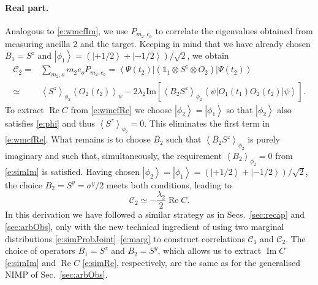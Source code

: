 \documentclass[epjST,numbook]{svjour}
\newcommand{\wmcf}{\mathscr{C}}
\newcommand{\ket}[1]{\left \vert #1 \right >}
\newcommand{\matel}[3]{ \displaystyle \left\langle #1 \right \vert #2 \left\vert  #3 \right\rangle }
\newcommand{\expval}[1]{\left\langle #1 \right\rangle}
\newcommand{\impart}[1]{\text{Im}\left[ #1 \right]}
\newcommand{\realpart}[1]{\text{Re}\left[ #1 \right]}
\DeclareMathOperator{\imp }{\mathrm{Im}}
\DeclareMathOperator{\rep}{\mathrm{Re}}
\begin{document}
\paragraph{Real part.} 
Analogous to \eqref{e:wmcfIm}, we use $P_{m_2,e_o}$ to correlate the eigenvalues obtained from measuring ancilla $2$ and the target. Keeping in mind that we have already chosen $B_1=S^z$ and $\ket{\phi_1}=(\ket{+1/2}+\ket{-1/2})/\sqrt{2}$, we obtain
\begin{equation}\label{e:wmcfRe}
\begin{split}
\wmcf_2 =& \sum_{m_2,o}m_2 e_o P_{m_2,e_o} = \matel{\Psi(t_2)}{(\mathds{1}_1\otimes S^z\otimes O_2)}{\Psi(t_2)} \\
\simeq& \expval{S^z}_{\phi_2}\expval{O_2(t_2)}_{\psi} -2\lambda_2\impart{\expval{B_2S^z}_{\phi_2} \matel{\psi}{O_1(t_1)O_2(t_2)}{\psi}} %
.
\end{split}
\end{equation}
To extract $\rep C$ from \eqref{e:wmcfRe} we choose $\ket{\phi_2}=\ket{\phi_1}$ so that $\ket{\phi_2}$ also satisfies \eqref{e:phi} and thus $\expval{S^z}_{\phi_2}=0$. This eliminates the first term in \eqref{e:wmcfRe}. What remains is to choose $B_2$ such that $\expval{B_2S^z}_{\phi_2}$ is purely imaginary and such that, simultaneously, the requirement $\expval{B_2}_{\phi_2} =0$ from \eqref{e:simIm} is satisfied. Having chosen $\ket{\phi_2}=\ket{\phi_1}=(\ket{+1/2}+\ket{-1/2})/\sqrt{2}$, the choice ${B_2=S^y=\sigma^y/2}$ meets both conditions, leading to
\begin{equation}\label{e:simRe}
	\wmcf_2 \simeq - \frac{\lambda_2}{2}\rep C .
\end{equation}
In this derivation we have followed a similar strategy as in Secs.~\ref{sec:recap} and \ref{sec:arbObs}, only with the new technical ingredient of using two marginal distributions \eqref{e:simProbJoint}--\eqref{e:marg} to construct correlations $\wmcf_1$ and $\wmcf_2$. The choice of operators $B_1=S^z$ and $B_2=S^y$, which allows us to extract $\imp C$ \eqref{e:simIm} and $\rep C$ \eqref{e:simRe}, respectively, are the same as for the generalised NIMP of Sec.~\ref{sec:arbObs}. 
\end{document}
